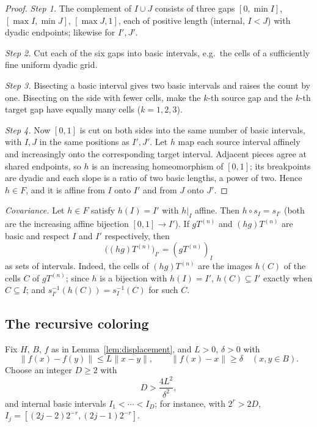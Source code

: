 \documentclass[11pt]{article}
\newcommand{\norm}[1]{\lVert #1\rVert}
\theoremstyle{definition}
\numberwithin{equation}{section}
\begin{document}
\begin{proof}
\emph{Step 1.} The complement of $I\cup J$ consists of three gaps
$[0,\min I]$, $[\max I,\min J]$, $[\max J,1]$, each of positive length
(internal, $I<J$) with dyadic endpoints; likewise for $I',J'$.

\emph{Step 2.} Cut each of the six gaps into basic intervals, e.g.\ the
cells of a sufficiently fine uniform dyadic grid.

\emph{Step 3.} Bisecting a basic interval gives two basic intervals and
raises the count by one. Bisecting on the side with fewer cells, make
the $k$-th source gap and the $k$-th target gap have equally many cells
($k=1,2,3$).

\emph{Step 4.} Now $[0,1]$ is cut on both sides into the same number of
basic intervals, with $I,J$ in the same positions as $I',J'$. Let $h$
map each source interval affinely and increasingly onto the
corresponding target interval. Adjacent pieces agree at shared
endpoints, so $h$ is an increasing homeomorphism of $[0,1]$; its
breakpoints are dyadic and each slope is a ratio of two basic lengths,
a power of two. Hence $h\in F$, and it is affine from $I$ onto $I'$ and
from $J$ onto $J'$.
\end{proof}

\emph{Covariance.} Let $h\in F$ satisfy $h(I)=I'$ with $h|_I$ affine.
Then $h\circ s_I=s_{I'}$ (both are the increasing affine bijection
$[0,1]\to I'$). If $gT^{(n)}$ and $(hg)T^{(n)}$ are basic and respect
$I$ and $I'$ respectively, then
\begin{equation}\label{dyad:covariance}
  \bigl((hg)T^{(n)}\bigr)_{I'}=(gT^{(n)})_I
\end{equation}
as sets of intervals. Indeed, the cells of $(hg)T^{(n)}$ are the images
$h(C)$ of the cells $C$ of $gT^{(n)}$; since $h$ is a bijection with
$h(I)=I'$, $h(C)\subseteq I'$ exactly when $C\subseteq I$; and
$s_{I'}^{-1}(h(C))=s_I^{-1}(C)$ for such $C$.

\subsection{The recursive coloring}\label{sec:coloring}

Fix $H$, $B$, $f$ as in Lemma~\ref{lem:displacement}, and $L>0$,
$\delta>0$ with
\begin{equation}\label{color:map}
  \norm{f(x)-f(y)}\leq L\norm{x-y},\qquad
  \norm{f(x)-x}\geq\delta\quad(x,y\in B).
\end{equation}
Choose an integer $D\ge2$ with
\begin{equation}\label{color:parameters}
  D>\frac{4L^2}{\delta^2},
\end{equation}
and internal basic intervals $I_1<\cdots<I_D$; for instance, with
$2^r>2D$, $I_j=[(2j-2)2^{-r},(2j-1)2^{-r}]$.
\end{document}
